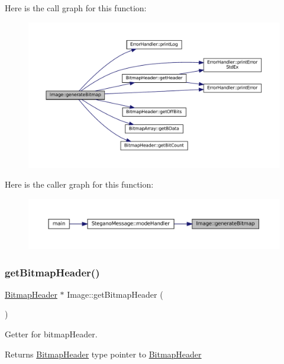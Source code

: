 Here is the call graph for this function\+:
\nopagebreak
\begin{figure}[H]
\begin{center}
\leavevmode
\includegraphics[width=350pt]{classImage_a3ca1ae6c1eb2846bfba066b01e6020e1_cgraph}
\end{center}
\end{figure}
Here is the caller graph for this function\+:
\nopagebreak
\begin{figure}[H]
\begin{center}
\leavevmode
\includegraphics[width=350pt]{classImage_a3ca1ae6c1eb2846bfba066b01e6020e1_icgraph}
\end{center}
\end{figure}
\mbox{\label{classImage_a8c824ffac0c866a94752a2c1047932af}} 
\subsubsection{\texorpdfstring{getBitmapHeader()}{getBitmapHeader()}}
{\footnotesize\ttfamily \mbox{\hyperlink{classBitmapHeader}{Bitmap\+Header}} $\ast$ Image\+::get\+Bitmap\+Header (\begin{DoxyParamCaption}{ }\end{DoxyParamCaption})}



Getter for bitmap\+Header. 

\begin{DoxyReturn}{Returns}
\mbox{\hyperlink{classBitmapHeader}{Bitmap\+Header}} type pointer to \mbox{\hyperlink{classBitmapHeader}{Bitmap\+Header}} 
\end{DoxyReturn}


